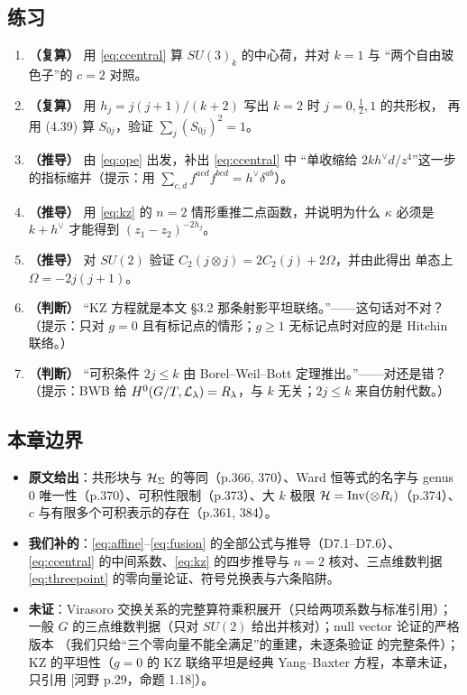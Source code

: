 \subsection{练习}

\begin{enumerate}[leftmargin=2em]
\item \textbf{（复算）} 用 \eqref{eq:ccentral} 算 $SU(3)_k$ 的中心荷，并对 $k=1$ 与
“两个自由玻色子”的 $c=2$ 对照。
\item \textbf{（复算）} 用 $h_j=j(j+1)/(k+2)$ 写出 $k=2$ 时 $j=0,\frac12,1$ 的共形权，
再用 (4.39) 算 $S_{0j}$，验证 $\sum_j(S_{0j})^2=1$。
\item \textbf{（推导）} 由 \eqref{eq:ope} 出发，补出 \eqref{eq:ccentral} 中
“单收缩给 $2kh^\vee d/z^4$”这一步的指标缩并（提示：用
$\sum_{c,d}f^{acd}f^{bcd}=h^\vee\delta^{ab}$）。
\item \textbf{（推导）} 用 \eqref{eq:kz} 的 $n=2$ 情形重推二点函数，并说明为什么
$\kappa$ 必须是 $k+h^\vee$ 才能得到 $(z_1-z_2)^{-2h_j}$。
\item \textbf{（推导）} 对 $SU(2)$ 验证 $C_2(j\otimes j)=2C_2(j)+2\Omega$，并由此得出
单态上 $\Omega=-2j(j+1)$。
\item \textbf{（判断）} “KZ 方程就是本文 \S3.2 那条射影平坦联络。”——这句话对不对？
（提示：只对 $g=0$ 且有标记点的情形；$g\ge1$ 无标记点时对应的是 Hitchin 联络。）
\item \textbf{（判断）} “可积条件 $2j\le k$ 由 Borel--Weil--Bott 定理推出。”——对还是错？
（提示：BWB 给 $H^0(G/T,\mathcal{L}_\lambda)=R_\lambda$，与 $k$ 无关；$2j\le k$ 来自仿射代数。）
\end{enumerate}

\subsection{本章边界}

\begin{boundary}
\begin{itemize}[leftmargin=1.4em]
\item \textbf{原文给出}：共形块与 $\mathcal{H}_\Sigma$ 的等同（p.366, 370）、Ward 恒等式的名字与
genus $0$ 唯一性（p.370）、可积性限制（p.373）、大 $k$ 极限 $\mathcal{H}=\mathrm{Inv}(\otimes R_i)$（p.374）、
$c$ 与有限多个可积表示的存在（p.361, 384）。
\item \textbf{我们补的}：\eqref{eq:affine}--\eqref{eq:fusion} 的全部公式与推导（D7.1--D7.6）、
\eqref{eq:ccentral} 的中间系数、\eqref{eq:kz} 的四步推导与 $n=2$ 核对、三点维数判据
\eqref{eq:threepoint} 的零向量论证、符号兑换表与六条陷阱。
\item \textbf{未证}：Virasoro 交换关系的完整算符乘积展开（只给两项系数与标准引用）；
一般 $G$ 的三点维数判据（只对 $SU(2)$ 给出并核对）；null vector 论证的严格版本
（我们只给“三个零向量不能全满足”的重建，未逐条验证  的完整条件）；
KZ 的平坦性（$g=0$ 的 KZ 联络平坦是经典 Yang--Baxter 方程，本章未证，只引用
[河野 p.29，命题 1.18]）。
\end{itemize}
\end{boundary}
